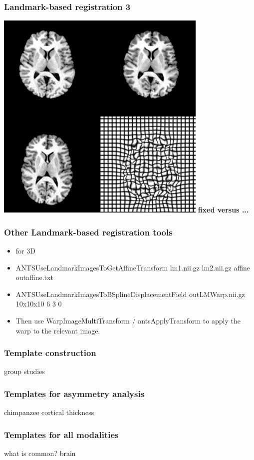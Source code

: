 \documentclass[18pt]{beamer}
\begin{document}
\begin{frame}
\frametitle{Landmark-based registration 3}
\begin{center}
\includegraphics[width=4in]{../figures/r64registrationlm.jpg}\newline
{\bf fixed versus ... }
\end{center}
\end{frame}


\begin{frame}
\frametitle{Other Landmark-based registration tools}
\begin{itemize}
\item for 3D
\item ANTSUseLandmarkImagesToGetAffineTransform lm1.nii.gz lm2.nii.gz affine outaffine.txt
\item ANTSUseLandmarkImagesToBSplineDisplacementField outLMWarp.nii.gz
  10x10x10 6 3 0
\item Then use WarpImageMultiTransform / antsApplyTransform to apply
  the warp to the relevant image.
\end{itemize}
\end{frame}


\begin{frame}
\frametitle{Template construction}
group studies 
\end{frame}

\begin{frame}
\frametitle{Templates for asymmetry analysis}
chimpanzee cortical thickness 
\end{frame}

\begin{frame}
\frametitle{Templates for all modalities}
what is common?  brain
\end{frame}
\end{document}
